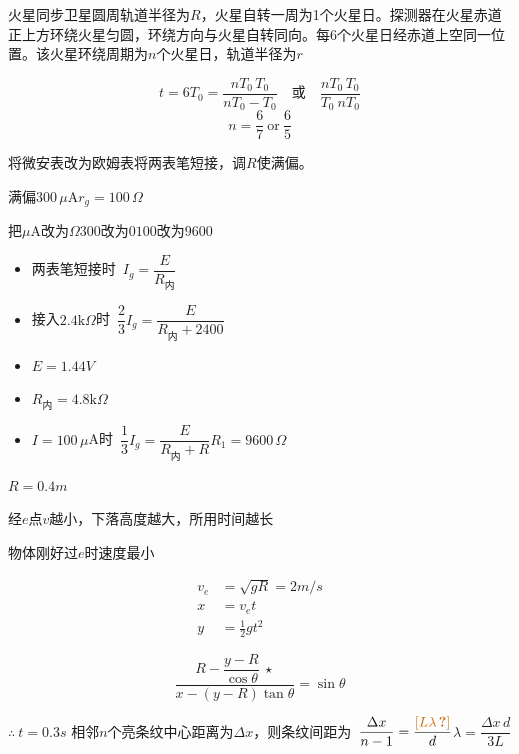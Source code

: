 \begin{problem}
火星同步卫星圆周轨道半径为$R$，火星自转一周为1个火星日。探测器在火星赤道正上方环绕火星匀圆，环绕方向与火星自转同向。每6个火星日经赤道上空同一位置。该火星环绕周期为$n$个火星日，轨道半径为$r$
\begin{solution}
\[
t=6T_0=\frac{nT_0\,T_0}{nT_0-T_0}\quad\text{或}\quad\frac{nT_0\,T_0}{T_0\ nT_0}
\]
\[
n=\frac{6}{7}\ \text{or}\ \frac{6}{5}
\]
\end{solution}
\end{problem}
将微安表改为欧姆表\quad 将两表笔短接，调$R$使满偏。

满偏$300\,\mu$A\quad $r_g=100\,\Omega$


把$\mu$A改为$\Omega$\quad $300$改为$0$\quad $100$改为$9600$

\begin{itemize}
\item 两表笔短接时\ $I_g=\dfrac{E}{R_{\text{内}}}$
\item 接入$2.4\mathrm{k}\Omega$时\ $\dfrac{2}{3}I_g=\dfrac{E}{R_{\text{内}}+2400}$
\item $E=1.44\unit{V}$
\item $R_{\text{内}}=4.8\mathrm{k}\Omega$
\item $I=100\,\mu$A时\ $\dfrac{1}{3}I_g=\dfrac{E}{R_{\text{内}}+R}$\quad $R_1=9600\,\Omega$ %
\end{itemize}

$R=0.4\unit{m}$

经$e$点$v$越小，下落高度越大，所用时间越长

物体刚好过$e$时速度最小

\begin{align*}
v_e&=\sqrt{gR}=2\unit{m/s}\\
x&=v_e t\\
y&=\tfrac{1}{2}gt^2
\end{align*}

\[
\frac{R-\dfrac{y-R}{\cos\theta}\ \star}{x-(y-R)\tan\theta}=\sin\theta
\]

$\therefore\ t=0.3\unit{s}$
相邻$n$个亮条纹中心距离为$\Delta x$，则条纹间距为\ $\dfrac{\Delta x}{n-1}=\dfrac{\unclear{L\lambda}}{d}$\qquad $\lambda=\dfrac{\Delta x\,d}{3L}$
